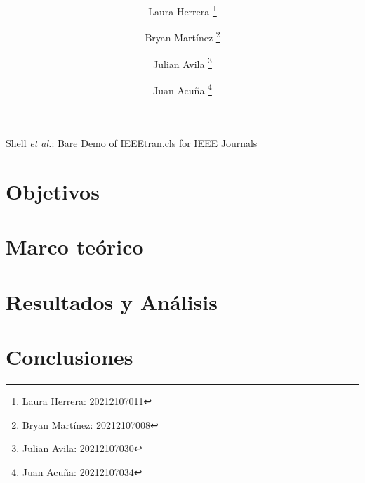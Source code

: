 \documentclass[journal, table]{IEEEtran}
\begin{document}
\title{\textbf{} \\
    \small{}}

\author[*]{Laura Herrera
    \thanks{Laura Herrera: 20212107011}}
\author[*]{Bryan Martínez
    \thanks{Bryan Martínez: 20212107008}}
\author[*]{Julian Avila
    \thanks{Julian Avila: 20212107030}}
\author[*]{Juan Acuña
    \thanks{Juan Acuña: 20212107034}}



\markboth{}
{Shell \MakeLowercase{\textit{et al.}}: Bare Demo of IEEEtran.cls for IEEE Journals}

\maketitle

\begin{abstract}

\end{abstract}

\begin{IEEEkeywords}

\end{IEEEkeywords}

\begin{abstract}

\end{abstract}

\begin{IEEEkeywords}

\end{IEEEkeywords}

\section{Objetivos}


\section{Marco teórico}


\section{Resultados y Análisis}


\section{Conclusiones}

\printbibliography
\end{document}
